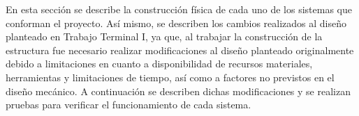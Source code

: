 En esta sección se describe la construcción física de cada uno de los sistemas que conforman el proyecto. Así mismo, se describen los cambios realizados al diseño planteado en Trabajo Terminal I, ya que, al trabajar la construcción de la estructura fue necesario realizar modificaciones al diseño planteado originalmente debido a limitaciones en cuanto a disponibilidad de recursos materiales, herramientas y limitaciones de tiempo, así como a factores no previstos en el diseño mecánico. A continuación se describen dichas modificaciones y se realizan pruebas para verificar el funcionamiento de cada sistema. 
%
